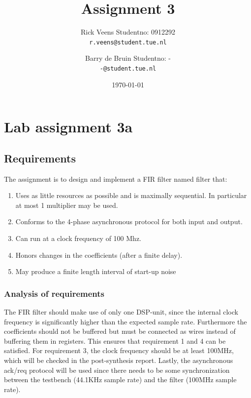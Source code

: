 \documentclass[a4paper,twoside,11pt, fleqn]{article}
\title{\vspace{-\baselineskip}\sffamily\bfseries Assignment 3}
\author{
	Rick Veens \qquad Studentno: 0912292\\
	\texttt{r.veens@student.tue.nl}
	\and
	Barry de Bruin \qquad Studentno: -\\
	\texttt{-@student.tue.nl}
}
\date{\today}
\begin{document}
\maketitle
\newpage

\section{Lab assignment 3a}

\subsection{Requirements}
\label{sec:req3a}

The assignment is to design and implement a FIR filter named filter that:
\begin{enumerate}
\item Uses as little resources as possible and is maximally sequential. In particular at most 1
multiplier may be used.
\item Conforms to the 4-phase asynchronous protocol for both input and output.
\item Can run at a clock frequency of 100 Mhz.
\item Honors changes in the coefficients (after a finite delay).
\item May produce a finite length interval of start-up noise
\end{enumerate}

\subsubsection{Analysis of requirements}
The FIR filter should make use of only one DSP-unit, since the internal clock frequency is significantly higher than the expected sample rate. Furthermore the coefficients should not be buffered but must be connected as wires instead of buffering them in registers. This ensures that requirement 1 and 4 can be satisfied. For requirement 3, the clock frequency should be at least 100MHz, which will be checked in the post-synthesis report. Lastly, the asynchronous ack/req protocol will be used since there needs to be some synchronization between the testbench (44.1KHz sample rate) and the filter (100MHz sample rate).
\end{document}
